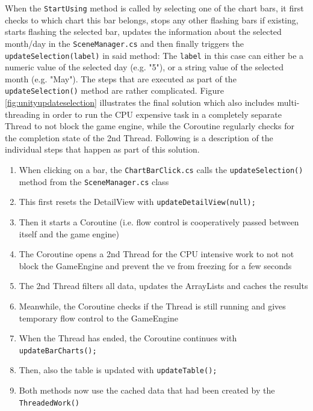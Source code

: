 When the \texttt{StartUsing} method is called by selecting one of the chart bars, it first checks to which chart this bar belongs, stops any other flashing bars if existing, starts flashing the selected bar, updates the information about the selected month/day in the \texttt{SceneManager.cs} and then finally triggers the \texttt{updateSelection(label)} in said method: The \texttt{label} in this case can either be a numeric value of the selected day (e.g. "5"), or a string value of the selected month (e.g. "May"). The steps that are executed as part of the \texttt{updateSelection()} method are rather complicated. Figure \ref{fig:unityupdateselection} illustrates the final solution which also includes multi-threading in order to run the CPU expensive task in a completely separate Thread to not block the game engine, while the Coroutine regularly checks for the completion state of the 2nd Thread. Following is a description of the individual steps that happen as part of this solution.
\begin{enumerate}
	\item When clicking on a bar, the \texttt{ChartBarClick.cs} calls the \texttt{updateSelection()} method from the \texttt{SceneManager.cs} class
	\item This first resets the DetailView with \texttt{updateDetailView(null);}
	\item Then it starts a Coroutine (i.e. flow control is cooperatively passed between itself and the game engine)
	\item The Coroutine opens a 2nd Thread for the CPU intensive work to not not block the GameEngine and prevent the \gls{ve} from freezing for a few seconds
	\item The 2nd Thread filters all data, updates the ArrayLists and caches the results
	\item Meanwhile, the Coroutine checks if the Thread is still running and gives temporary flow control to the GameEngine
	\item When the Thread has ended, the Coroutine continues with \texttt{updateBarCharts();}
	\item Then, also the table is updated with \texttt{updateTable();}
	\item Both methods now use the cached data that had been created by the \texttt{ThreadedWork()}
\end{enumerate}
